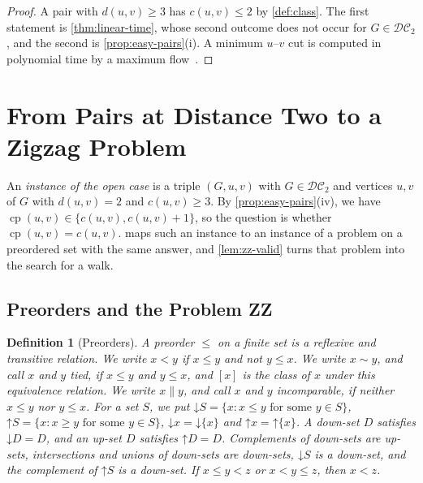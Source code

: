 \documentclass[pdflatex,sn-mathphys-num]{sn-jnl}%
\theoremstyle{thmstyleone}%
\theoremstyle{thmstyletwo}%
\theoremstyle{thmstylethree}%
\newtheorem{definition}{Definition}%
\newcommand{\cp}{\operatorname{cp}}%
\newcommand{\DC}{\mathcal{DC}_2}%
\newcommand{\dn}{\mathord{\downarrow}}%
\newcommand{\upp}{\mathord{\uparrow}}%
\begin{document}
\begin{proof}
A pair with $d(u, v) \geq 3$ has $c(u, v) \leq 2$ by \cref{def:class}.
The first statement is \cref{thm:linear-time}, whose second outcome does not occur for $G \in \DC$, and the second is \cref{prop:easy-pairs}(i).
A minimum $u$--$v$ cut is computed in polynomial time by a maximum flow~\cite[Sections~10.3 and~10.4]{Erickson2019Algorithms}.
\end{proof}

\section{From Pairs at Distance Two to a Zigzag Problem}
\label{sec:zz-zigzag}

An \emph{instance of the open case} is a triple $(G, u, v)$ with $G \in \DC$ and vertices $u, v$ of $G$ with $d(u, v) = 2$ and $c(u, v) \geq 3$.
By \cref{prop:easy-pairs}(iv), we have $\cp(u, v) \in \{c(u, v), c(u, v) + 1\}$, so the question is whether $\cp(u, v) = c(u, v)$.
 maps such an instance to an instance of a problem on a preordered set with the same answer, and \cref{lem:zz-valid} turns that problem into the search for a walk.

\subsection{Preorders and the Problem ZZ}
\label{sec:zz-preorders}

\begin{definition}[Preorders]
\label{def:zz-preorder}
A \emph{preorder} $\leq$ on a finite set is a reflexive and transitive relation.
We write $x < y$ if $x \leq y$ and not $y \leq x$.
We write $x \sim y$, and call $x$ and $y$ \emph{tied}, if $x \leq y$ and $y \leq x$, and $[x]$ is the class of $x$ under this equivalence relation.
We write $x \parallel y$, and call $x$ and $y$ \emph{incomparable}, if neither $x \leq y$ nor $y \leq x$.
For a set $S$, we put $\dn S = \{x : x \leq y \text{ for some } y \in S\}$, $\upp S = \{x : x \geq y \text{ for some } y \in S\}$, $\dn x = \dn \{x\}$ and $\upp x = \upp \{x\}$.
A \emph{down-set} $D$ satisfies $\dn D = D$, and an \emph{up-set} $D$ satisfies $\upp D = D$.
Complements of down-sets are up-sets, intersections and unions of down-sets are down-sets, $\dn S$ is a down-set, and the complement of $\upp S$ is a down-set.
If $x \leq y < z$ or $x < y \leq z$, then $x < z$.
\end{definition}
\end{document}
